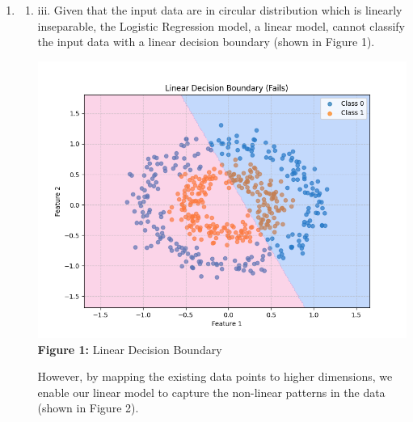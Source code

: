 \documentclass{article}
\theoremstyle{definition}
\theoremstyle{remark}
\newenvironment{Q}
        {%
          \clearpage
          \item
        }
        {%
          \phantom{s} %
          \bigskip
        }
\begin{document}
\begin{enumerate}[font={\Large\bfseries},left=0pt]
\begin{Q}
\begin{enumerate}
{\begin{enumerate}
			      \end{enumerate}
			      }
		\end{enumerate}
	\end{Q}
	\begin{tcolorbox}
		\begin{enumerate}
			\item iii. Given that the input data are in circular distribution which is linearly inseparable, the Logistic Regression model, a linear model, cannot classify the input data with a linear decision boundary (shown in Figure 1).

			      \begin{center}
				      \centering
				      \includegraphics[width=0.7\linewidth]{submission_4a_linear_decision_boundary.png} \\
				      \textbf{Figure 1:} Linear Decision Boundary
			      \end{center}

			      However, by mapping the existing data points to higher dimensions, we enable our linear model to capture the non-linear patterns in the data (shown in Figure 2).


\end{enumerate}
\end{tcolorbox}
\end{enumerate}
\end{document}
